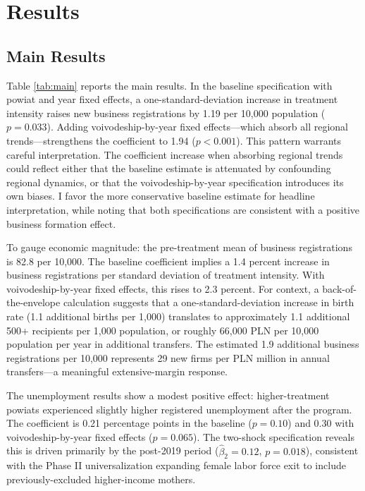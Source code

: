 \documentclass[12pt]{article}
\begin{document}
\section{Results}

\subsection{Main Results}



Table \ref{tab:main} reports the main results. In the baseline specification with powiat and year fixed effects, a one-standard-deviation increase in treatment intensity raises new business registrations by 1.19 per 10,000 population ($p = 0.033$). Adding voivodeship-by-year fixed effects---which absorb all regional trends---strengthens the coefficient to 1.94 ($p < 0.001$). This pattern warrants careful interpretation. The coefficient increase when absorbing regional trends could reflect either that the baseline estimate is attenuated by confounding regional dynamics, or that the voivodeship-by-year specification introduces its own biases. I favor the more conservative baseline estimate for headline interpretation, while noting that both specifications are consistent with a positive business formation effect.

To gauge economic magnitude: the pre-treatment mean of business registrations is 82.8 per 10,000. The baseline coefficient implies a 1.4 percent increase in business registrations per standard deviation of treatment intensity. With voivodeship-by-year fixed effects, this rises to 2.3 percent. For context, a back-of-the-envelope calculation suggests that a one-standard-deviation increase in birth rate (1.1 additional births per 1,000) translates to approximately 1.1 additional 500+ recipients per 1,000 population, or roughly 66,000 PLN per 10,000 population per year in additional transfers. The estimated 1.9 additional business registrations per 10,000 represents 29 new firms per PLN million in annual transfers---a meaningful extensive-margin response.

The unemployment results show a modest positive effect: higher-treatment powiats experienced slightly higher registered unemployment after the program. The coefficient is 0.21 percentage points in the baseline ($p = 0.10$) and 0.30 with voivodeship-by-year fixed effects ($p = 0.065$). The two-shock specification reveals this is driven primarily by the post-2019 period ($\hat{\beta}_2 = 0.12$, $p = 0.018$), consistent with the Phase II universalization expanding female labor force exit to include previously-excluded higher-income mothers.
\end{document}
